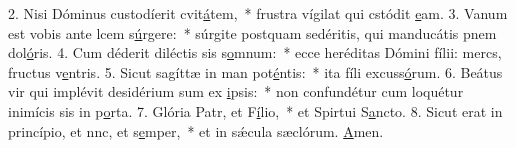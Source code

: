 2. Nisi Dóminus custodíerit cvit\uline{á}tem,~* frustra vígilat qui cstódit \uline{e}am.
3. Vanum est vobis ante lcem s\uline{ú}rgere:~* súrgite postquam sedéritis, qui manducátis pnem dol\uline{ó}ris.
4. Cum déderit diléctis sis s\uline{o}mnum:~* ecce heréditas Dómini fílii: mercs, fructus v\uline{e}ntris.
5. Sicut sagíttæ in man pot\uline{é}ntis:~* ita fíli excuss\uline{ó}rum.
6. Beátus vir qui implévit desidérium sum ex \uline{i}psis:~* non confundétur cum loquétur inimícis sis in p\uline{o}rta.
7. Glória Patr, et F\uline{í}lio,~* et Spirtui S\uline{a}ncto.
8. Sicut erat in princípio, et nnc, et s\uline{e}mper,~* et in sǽcula sæclórum. \uline{A}men.
